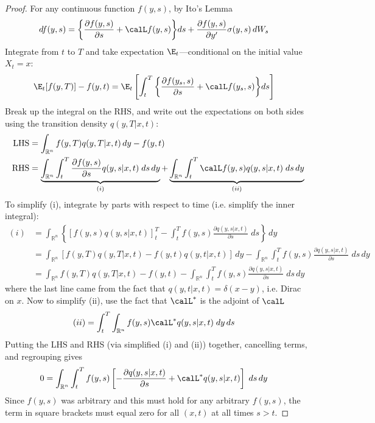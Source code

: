 \documentclass[12pt]{article}
\theoremstyle{plain}
\theoremstyle{definition}
\theoremstyle{remark}
\newcommand{\Rn}{\mathbb{R}^n}
\begin{document}
\begin{proof}
For any continuous function $f(y,s)$, by Ito's Lemma
\begin{align*}
  df(y,s)
  &=
  \bigg\{
  \frac{\partial f(y,s)}{\partial s}
  +
  \calL f(y,s)
  \bigg\}
  ds
  +
  \frac{\partial f(y,s)}{\partial y'}
  \sigma(y,s)
  \,dW_s
\end{align*}
Integrate from $t$ to $T$ and take expectation $\E_t$---conditional on
the initial value $X_t=x$:
\begin{align*}
  \E_t[f(y,T)]-f(y,t)
  &=
  \E_t\left[
  \int_t^T
  \bigg\{
  \frac{\partial f(y_s,s)}{\partial s}
  +
  \calL f(y_s,s)
  \bigg\}
  ds
  \right]
\end{align*}
Break up the integral on the RHS, and write out the expectations on both
sides using the transition density $q(y,T|x,t)$:
\begin{align*}
  \text{LHS}
  &=
  \int_{\Rn}
  f(y,T)
  q(y,T|x,t)
  \,dy
  -
  f(y,t)
  \\
  \text{RHS}
  &=
  \underbrace{%
    \int_{\Rn}
    \int_t^T
    \frac{\partial f(y,s)}{\partial s}
    q(y,s|x,t)
    \;ds
    \,dy
  }_{(i)}
  +
  \underbrace{%
    \int_{\Rn}
    \int_t^T
    \calL f(y,s)
    q(y,s|x,t)
    \;ds
    \,dy
  }_{(ii)}
\end{align*}
To simplify (i), integrate by parts with respect to time (i.e. simplify
the inner integral):
\begin{align*}
  (i)
  &=
  \int_{\Rn}
  \left\{
  \left[
    f(y,s)
    q(y,s|x,t)
  \right]_t^T
  -
  \int_t^T
  f(y,s)\frac{\partial q(y,s|x,t)}{\partial s}
  \;ds
  \right\}
  \,dy
  \\
  &=
  \int_{\Rn}
  \left[
    f(y,T)
    q(y,T|x,t)
    -
    f(y,t)
    q(y,t|x,t)
  \right]
  \,dy
  -
  \int_{\Rn}
  \int_t^T
  f(y,s)\frac{\partial q(y,s|x,t)}{\partial s}
  \;ds
  \,dy
  \\
  &=
  \int_{\Rn}
  f(y,T)
  q(y,T|x,t)
  -
  f(y,t)
  -
  \int_{\Rn}
  \int_t^T
  f(y,s)\frac{\partial q(y,s|x,t)}{\partial s}
  \;ds
  \,dy
\end{align*}
where the last line came from the fact that $q(y,t|x,t)=\delta(x-y)$,
i.e. Dirac on $x$.
Now to simplify (ii), use the fact that $\calL^*$ is the adjoint of
$\calL$
\begin{align*}
  (ii)
  &=
  \int_t^T
  \int_{\Rn}
  f(y,s)
  \calL^* q(y,s|x,t)
  \;dy
  \,ds
\end{align*}
Putting the LHS and RHS (via simplified (i) and (ii)) together,
cancelling terms, and regrouping gives
\begin{align*}
  0
  &=
  \int_{\Rn}
  \int_t^T
  f(y,s)
  \left[
  -\frac{\partial q(y,s|x,t)}{\partial s}
  +
  \calL^* q(y,s|x,t)
  \right]
  \;ds
  \,dy
\end{align*}
Since $f(y,s)$ was arbitrary and this must hold for any arbitrary
$f(y,s)$, the term in square brackets must equal zero for all $(x,t)$ at
all times $s>t$.


\end{proof}
\end{document}
